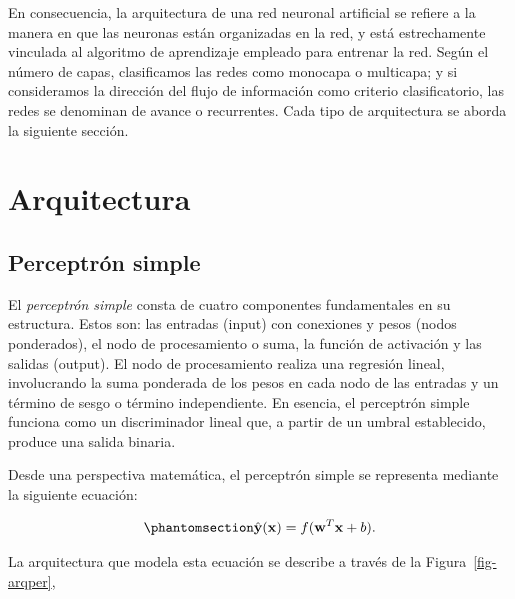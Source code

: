 \documentclass[
  us-letterpaper,
]{scrreprt}
\theoremstyle{plain}
\theoremstyle{definition}
\theoremstyle{definition}
\theoremstyle{plain}
\theoremstyle{remark}
\begin{document}
En consecuencia, la arquitectura de una red neuronal artificial se
refiere a la manera en que las neuronas están organizadas en la red, y
está estrechamente vinculada al algoritmo de aprendizaje empleado para
entrenar la red. Según el número de capas, clasificamos las redes como
monocapa o multicapa; y si consideramos la dirección del flujo de
información como criterio clasificatorio, las redes se denominan de
avance o recurrentes. Cada tipo de arquitectura se aborda la siguiente
sección.

\section{Arquitectura}\label{arquitectura}

\subsection{Perceptrón simple}\label{perceptruxf3n-simple}

El \emph{perceptrón simple} consta de cuatro componentes fundamentales
en su estructura. Estos son: las entradas (input) con conexiones y pesos
(nodos ponderados), el nodo de procesamiento o suma, la función de
activación y las salidas (output). El nodo de procesamiento realiza una
regresión lineal, involucrando la suma ponderada de los pesos en cada
nodo de las entradas y un término de sesgo o término independiente. En
esencia, el perceptrón simple funciona como un discriminador lineal que,
a partir de un umbral establecido, produce una salida binaria.

Desde una perspectiva matemática, el perceptrón simple se representa
mediante la siguiente ecuación:

\begin{equation}\phantomsection\label{eq-perceptron}{
\hat{\mathbf{y}}(\mathbf x)=f(\mathbf w^T\mathbf x+b).
}\end{equation}

La arquitectura que modela esta ecuación se describe a través de la
Figura~\ref{fig-arqper},
\end{document}
